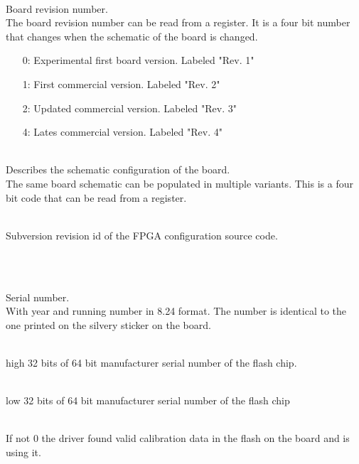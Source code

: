 			\\
			Board revision number.\\
			The board revision number can be read from a register. It is a four bit number that changes when the schematic of the board is changed.
			\begin{itemize}
				\item[0:] Experimental first board version. Labeled "Rev. 1"
				\item[1:] First commercial version. Labeled "Rev. 2"
				\item[2:] Updated commercial version. Labeled "Rev. 3"
				\item[4:] Lates commercial version. Labeled "Rev. 4"
			\end{itemize}

			\\
			Describes the schematic configuration of the board.\\
			The same board schematic can be populated in multiple variants. This is a four bit code that can be read from a register.

			\\
			Subversion revision id of the FPGA configuration source code.

			\\
			\par

			\\
			Serial number.\\
			With year and running number in 8.24 format. The number is identical to the one printed on the silvery sticker on the board.\par

			\\
			high 32 bits of 64 bit manufacturer serial number of the flash chip.

			\\
			low 32 bits of 64 bit manufacturer serial number of the flash chip

			\\
			If not 0 the driver found valid calibration data in the flash on the board and is using it.\par

